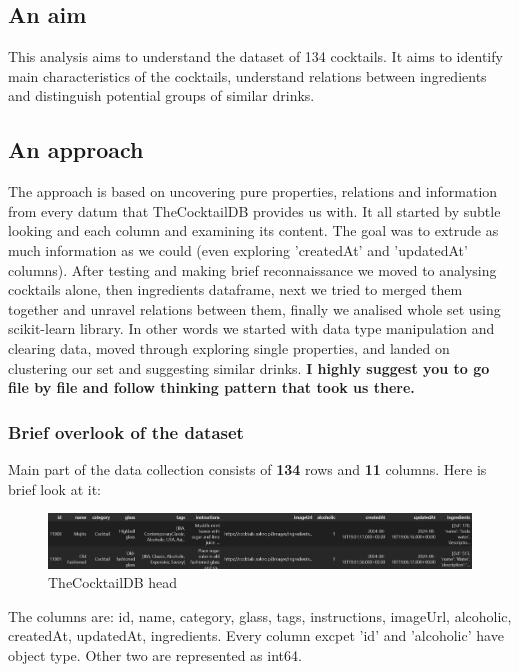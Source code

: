 \documentclass[a4paper]{article}
\begin{document}
\subsection{An aim}
This analysis aims to understand the dataset of 134 cocktails. It aims to identify main characteristics of the cocktails, understand relations between ingredients and distinguish potential groups of similar drinks.

\subsection{An approach}
The approach is based on uncovering pure properties, relations and information from every datum that TheCocktailDB provides us with. It all started by subtle looking and each column and examining its content. The goal was to extrude as much information as we could (even exploring 'createdAt' and 'updatedAt' columns). After testing and making brief reconnaissance we moved to analysing cocktails alone, then ingredients dataframe, next we tried to merged them together and unravel relations between them, finally we analised whole set using scikit-learn library. In other words we started with data type manipulation and clearing data, moved through exploring single properties, and landed on clustering our set and suggesting similar drinks. \textbf{I highly suggest you to go file by file and follow thinking pattern that took us there.}

\subsubsection{Brief overlook of the dataset}
Main part of the data collection consists of \textbf{134} rows and \textbf{11} columns. Here is brief look at it:

\begin{figure}[H]
    \centering
    \includegraphics[width=1\linewidth]{base_head.png}
    \caption{TheCocktailDB head}
    \label{fig:TheCocktailDB_head}
\end{figure}

The columns are: id, name, category, glass, tags, instructions, imageUrl, alcoholic, createdAt, updatedAt, ingredients. Every column excpet 'id' and 'alcoholic' have object type. Other two are represented as int64.
\end{document}
